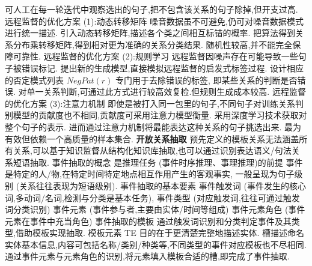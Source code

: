 \documentclass[10pt, utf8]{ctexart}
\begin{document}
\begin{multicols}{4}
    可人工在每一轮迭代中观察选出的句子,把不包含该关系的句子除掉,但开支过高.
    {\color{blue}远程监督的优化方案 (1):动态转移矩阵}
    噪音数据虽不可避免,仍可对噪音数据模式进行统一描述.
    引入动态转移矩阵,描述各个类之间相互标错的概率.
    把算法得到关系分布乘转移矩阵,得到相对更为准确的关系分类结果.
    随机性较高,并不能完全保障可靠性.
    {\color{blue}远程监督的优化方案 (2):规则学习}
    远程监督因噪声存在可能导致一些句子被错误标记.
    提出新的生成模型,直接模拟远程监督的启发式标签过程.
    设计相应的否定模式列表 $NegPat(r)$ 专门用于去除错误的标签,
    即某些关系的判断是否错误.
    对单一关系判断,可通过此方式进行较高效复检.但规则生成成本较高.
    {\color{blue}远程监督的优化方案 (3):注意力机制}
    即使是被打入同一包里的句子,不同句子对训练关系判别模型的贡献度也不相同,贡献度可采用注意力模型衡量.
    采用深度学习技术获取对整个句子的表示.
    进而通过注意力机制将最能表达这种关系的句子挑选出来.
    最为有效但依赖一个高质量的样本集合.
    {\color{purple_}\textbf{开放关系抽取}}
    预先定义的模板关系无法涵盖所有关系,可以基于知识监督从结构化知识库抽取,也可以通过识别表达语义/句法关系短语抽取.
    {\color{blue}事件抽取的概念}
    是推理任务 (事件时序推理、事理推理)的前提
    事件是特定的人/物,在特定时间特定地点相互作用产生的客观事实,
    一般呈现为句子级别 (关系往往表现为短语级别).
        {\color{blue}事件抽取的基本要素}
    事件触发词 (事件发生的核心词,多动词/名词,检测与分类是基本任务),
    事件类型 (对应触发词,往往可通过触发词分类识别)
    事件元素 (事件参与者,主要由实体/时间等组成)
    事件元素角色 (事件元素在事件中充当角色)
    {\color{blue}事件抽取的模板}
    通过触发词识别和分类判定事件及其类型,借助模板实现抽取.
    模板元素 TE 目的在于更清楚完整地描述实体.
    槽描述命名实体基本信息,内容可包括名称/类别/种类等,不同类型的事件对应模板也不尽相同.
    通过事件元素与元素角色的识别,将元素填入模板合适的槽,即完成了事件抽取.


\end{multicols}
\end{document}
